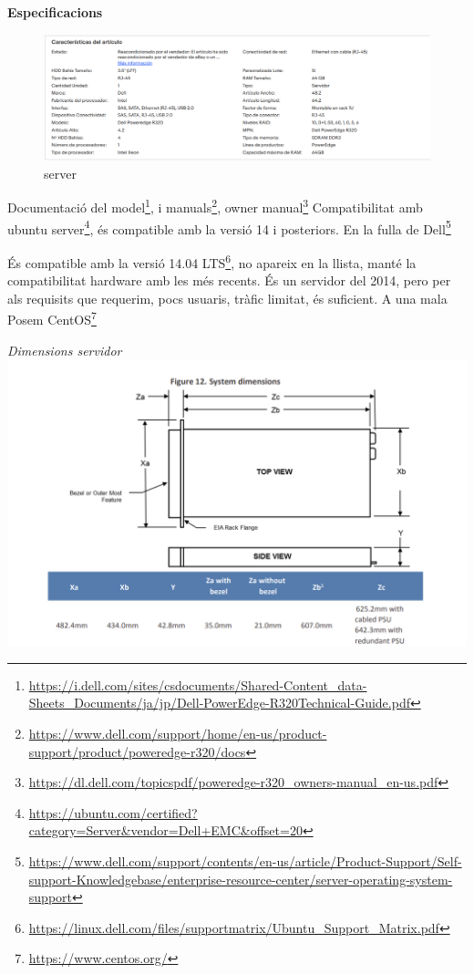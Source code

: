 \documentclass[
  10pt,
]{krantz}
\DeclareRobustCommand{\href}[2]{#2\footnote{\url{#1}}}
\begin{document}
\textbf{Especificacions}

\begin{figure}
\centering
\includegraphics{imatges/server_hp.png}
\caption{server}
\end{figure}

\begin{rmdnote}{}
\href{https://i.dell.com/sites/csdocuments/Shared-Content_data-Sheets_Documents/ja/jp/Dell-PowerEdge-R320Technical-Guide.pdf}{Documentació del model}, i \href{https://www.dell.com/support/home/en-us/product-support/product/poweredge-r320/docs}{manuals}, \href{https://dl.dell.com/topicspdf/poweredge-r320_owners-manual_en-us.pdf}{owner manual} Compatibilitat amb \href{https://ubuntu.com/certified?category=Server\&vendor=Dell+EMC\&offset=20}{ubuntu server}, és compatible amb la versió 14 i posteriors. En la fulla de \href{https://www.dell.com/support/contents/en-us/article/Product-Support/Self-support-Knowledgebase/enterprise-resource-center/server-operating-system-support}{Dell}

\end{rmdnote}

\begin{rmdinfo}{}
És compatible amb la \href{https://linux.dell.com/files/supportmatrix/Ubuntu_Support_Matrix.pdf}{versió 14.04 LTS}, no apareix en la llista, manté la compatibilitat hardware amb les més recents. És un servidor del 2014, pero per als requisits que requerim, pocs usuaris, tràfic limitat, és suficient. A una mala Posem \href{https://www.centos.org/}{CentOS}

\end{rmdinfo}

\emph{Dimensions servidor} \includegraphics{imatges/dimserver.png}
\end{document}
